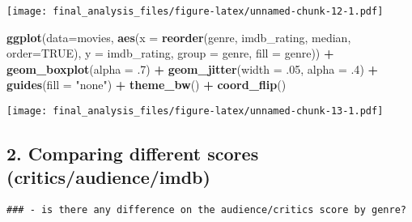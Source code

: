 \documentclass[]{article}
\newenvironment{Shaded}{\begin{snugshade}}{\end{snugshade}}
\newcommand{\DataTypeTok}[1]{\textcolor[rgb]{0.13,0.29,0.53}{#1}}
\newcommand{\FloatTok}[1]{\textcolor[rgb]{0.00,0.00,0.81}{#1}}
\newcommand{\KeywordTok}[1]{\textcolor[rgb]{0.13,0.29,0.53}{\textbf{#1}}}
\newcommand{\NormalTok}[1]{#1}
\newcommand{\OperatorTok}[1]{\textcolor[rgb]{0.81,0.36,0.00}{\textbf{#1}}}
\newcommand{\OtherTok}[1]{\textcolor[rgb]{0.56,0.35,0.01}{#1}}
\newcommand{\StringTok}[1]{\textcolor[rgb]{0.31,0.60,0.02}{#1}}
\begin{document}
\texttt{[image: final\_analysis\_files/figure-latex/unnamed-chunk-12-1.pdf]}

\begin{Shaded}
\begin{Highlighting}[]
\KeywordTok{ggplot}\NormalTok{(}\DataTypeTok{data=}\NormalTok{movies, }\KeywordTok{aes}\NormalTok{(}\DataTypeTok{x =} \KeywordTok{reorder}\NormalTok{(genre, imdb_rating, median, }\DataTypeTok{order=}\OtherTok{TRUE}\NormalTok{), }\DataTypeTok{y =}\NormalTok{ imdb_rating, }\DataTypeTok{group =}\NormalTok{ genre, }\DataTypeTok{fill =}\NormalTok{ genre)) }\OperatorTok{+}\StringTok{ }\KeywordTok{geom_boxplot}\NormalTok{(}\DataTypeTok{alpha =} \FloatTok{.7}\NormalTok{) }\OperatorTok{+}\StringTok{ }\KeywordTok{geom_jitter}\NormalTok{(}\DataTypeTok{width =} \FloatTok{.05}\NormalTok{, }\DataTypeTok{alpha =} \FloatTok{.4}\NormalTok{) }\OperatorTok{+}\StringTok{ }\KeywordTok{guides}\NormalTok{(}\DataTypeTok{fill =} \StringTok{"none"}\NormalTok{) }\OperatorTok{+}\StringTok{ }\KeywordTok{theme_bw}\NormalTok{() }\OperatorTok{+}\StringTok{ }\KeywordTok{coord_flip}\NormalTok{()}
\end{Highlighting}
\end{Shaded}

\texttt{[image: final\_analysis\_files/figure-latex/unnamed-chunk-13-1.pdf]}

\hypertarget{comparing-different-scores-criticsaudienceimdb-1}{%
\subsection{2. Comparing different scores
(critics/audience/imdb)}\label{comparing-different-scores-criticsaudienceimdb-1}}

\begin{verbatim}
### - is there any difference on the audience/critics score by genre?
\end{verbatim}
\end{document}
